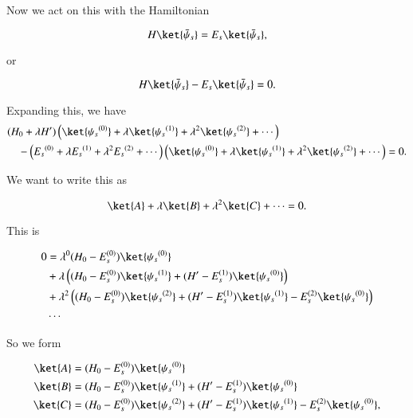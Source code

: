 Now we act on this with the Hamiltonian

\begin{equation}\label{eqn:qmTwoL4:340}
H \ket{\bar{\psi}_s} = E_s \ket{\bar{\psi}_s},
\end{equation}

or

\begin{equation}\label{eqn:qmTwoL4:360}
H \ket{\bar{\psi}_s} - E_s \ket{\bar{\psi}_s} = 0.
\end{equation}

Expanding this, we have
\begin{equation}\label{eqn:qmTwoL4:380}
\begin{aligned}
&(H_0 + \lambda H') 
\left(
\ket{{\psi_s}^{(0)}} 
+ 
\lambda \ket{{\psi_s}^{(1)}} 
+ 
\lambda^2 \ket{{\psi_s}^{(2)}} 
+ \cdots
\right) \\
&\quad - 
\left( {E_s}^{(0)} + \lambda {E_s}^{(1)} + \lambda^2 {E_s}^{(2)} + \cdots \right)
\left(
\ket{{\psi_s}^{(0)}} 
+ 
\lambda \ket{{\psi_s}^{(1)}} 
+ 
\lambda^2 \ket{{\psi_s}^{(2)}} 
+ \cdots
\right)
= 0.
\end{aligned}
\end{equation}

We want to write this as

\begin{equation}\label{eqn:qmTwoL4:400}
\ket{A} + \lambda \ket{B} + \lambda^2 \ket{C} + \cdots = 0.
\end{equation}

This is

\begin{equation}\label{eqn:qmTwoL4:420}
\begin{aligned}
0 &=
\lambda^0
(H_0 - E_s^{(0)}) \ket{{\psi_s}^{(0)}}  \\
&+ \lambda
\left(
(H_0 - E_s^{(0)}) \ket{{\psi_s}^{(1)}} 
+(H' - E_s^{(1)}) \ket{{\psi_s}^{(0)}} 
\right) \\
&+ \lambda^2
\left(
(H_0 - E_s^{(0)}) \ket{{\psi_s}^{(2)}} 
+(H' - E_s^{(1)}) \ket{{\psi_s}^{(1)}} 
-E_s^{(2)} \ket{{\psi_s}^{(0)}} 
\right) \\
&\cdots
\end{aligned}
\end{equation}

So we form

\begin{align}\label{eqn:qmTwoL4:440}
\ket{A} &=
(H_0 - E_s^{(0)}) \ket{{\psi_s}^{(0)}} \\
\ket{B} &=
(H_0 - E_s^{(0)}) \ket{{\psi_s}^{(1)}} 
+(H' - E_s^{(1)}) \ket{{\psi_s}^{(0)}} \\
\ket{C} &=
(H_0 - E_s^{(0)}) \ket{{\psi_s}^{(2)}} 
+(H' - E_s^{(1)}) \ket{{\psi_s}^{(1)}} 
-E_s^{(2)} \ket{{\psi_s}^{(0)}},
\end{align}

